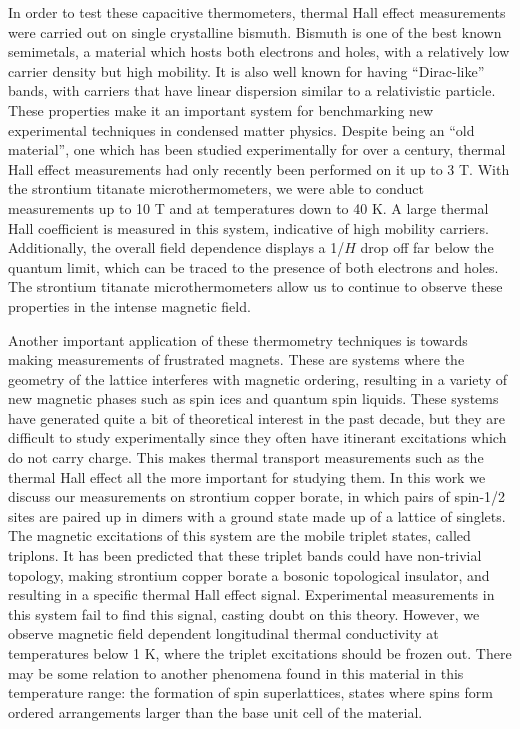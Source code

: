 \documentclass{thesis-umich}
\begin{document}
In order to test these capacitive thermometers, thermal Hall effect measurements were carried out on single crystalline bismuth. Bismuth is one of the best known semimetals, a material which hosts both electrons and holes, with a relatively low carrier density but high mobility. It is also well known for having ``Dirac-like'' bands, with carriers that have linear dispersion similar to a relativistic particle. These properties make it an important system for benchmarking new experimental techniques in condensed matter physics. Despite being an ``old material'', one which has been studied experimentally for over a century, thermal Hall effect measurements had only recently been performed on it up to 3 T. With the strontium titanate microthermometers, we were able to conduct measurements up to 10 T and at temperatures down to 40 K. A large thermal Hall coefficient is measured in this system, indicative of high mobility carriers. Additionally, the overall field dependence displays a 1/$H$ drop off far below the quantum limit, which can be traced to the presence of both electrons and holes. The strontium titanate microthermometers allow us to continue to observe these properties in the intense magnetic field.

Another important application of these thermometry techniques is towards making measurements of frustrated magnets. These are systems where the geometry of the lattice interferes with magnetic ordering, resulting in a variety of new magnetic phases such as spin ices and quantum spin liquids. These systems have generated quite a bit of theoretical interest in the past decade, but they are difficult to study experimentally since they often have itinerant excitations which do not carry charge. This makes thermal transport measurements such as the thermal Hall effect all the more important for studying them. In this work we discuss our measurements on strontium copper borate, in which pairs of spin-1/2 sites are paired up in dimers with a ground state made up of a lattice of singlets. The magnetic excitations of this system are the mobile triplet states, called triplons. It has been predicted that these triplet bands could have non-trivial topology, making strontium copper borate a bosonic topological insulator, and resulting in a specific thermal Hall effect signal. Experimental measurements in this system fail to find this signal, casting doubt on this theory. However, we observe magnetic field dependent longitudinal thermal conductivity at temperatures below 1 K, where the triplet excitations should be frozen out. There may be some relation to another phenomena found in this material in this temperature range: the formation of spin superlattices, states where spins form ordered arrangements larger than the base unit cell of the material.
\end{document}
